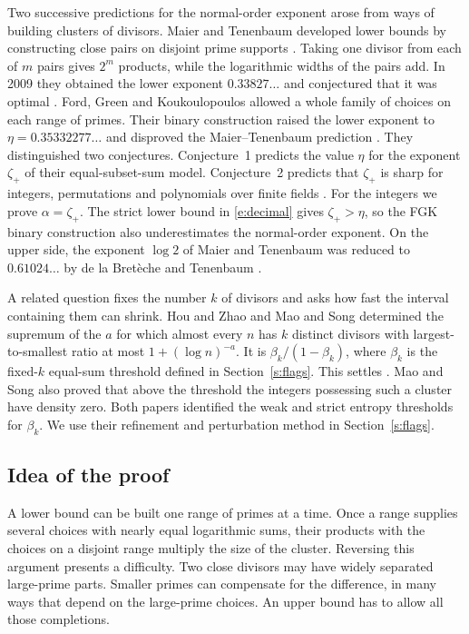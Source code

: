 \documentclass[11pt]{article}
\numberwithin{equation}{section}
\begin{document}
Two successive predictions for the normal-order exponent arose
from ways of building clusters of divisors. Maier and Tenenbaum
developed lower bounds by constructing close pairs on disjoint prime
supports \cite{mt85,mt09}. Taking one divisor from each of $m$ pairs
gives $2^m$ products, while the logarithmic widths of the pairs add.
In 2009 they obtained the lower exponent $0.33827\ldots$ and
conjectured that it was optimal \cite[Theorems~1.3--1.4 and the
conjecture following Theorem~1.4]{mt09}.
Ford, Green and Koukoulopoulos allowed a whole family of choices
on each range of primes. Their binary construction raised the lower
exponent to $\eta=0.35332277\ldots$ and disproved the Maier--Tenenbaum
prediction \cite[Corollary~1 and Theorem~3]{fgk}. They distinguished
two conjectures. Conjecture~1 predicts the value $\eta$ for the
exponent $\zeta_+$ of their equal-subset-sum model. Conjecture~2
predicts that $\zeta_+$ is sharp for integers, permutations and
polynomials over finite fields \cite{fgk}. For the integers we prove
$\alpha=\zeta_+$. The strict lower bound in \eqref{e:decimal} gives
$\zeta_+>\eta$, so the FGK binary construction also underestimates
the normal-order exponent. On the upper side, the exponent $\log2$ of Maier and
Tenenbaum \cite{mt09} was reduced to $0.61024\ldots$ by
de la Bret\`eche and Tenenbaum \cite{bt}.

A related question fixes the number $k$ of divisors and asks how
fast the interval containing them can shrink. Hou and Zhao
\cite[Theorem~2]{hz} and Mao and Song \cite[Theorem~1.2]{ms} determined
the supremum of the $a$ for which almost every $n$ has $k$ distinct
divisors with largest-to-smallest ratio at most $1+(\log n)^{-a}$.
It is $\beta_k/(1-\beta_k)$, where $\beta_k$ is the fixed-$k$
equal-sum threshold defined in Section~\ref{s:flags}. This settles
\cite[Conjecture~3]{fgk}. Mao and Song also proved that above the
threshold the integers possessing such a cluster have density zero.
Both papers identified the weak and strict entropy thresholds for
$\beta_k$. We use their refinement and perturbation method in
Section~\ref{s:flags}.

\subsection*{Idea of the proof}

A lower bound can be built one range of primes at a time. Once a
range supplies several choices with nearly equal logarithmic sums,
their products with the choices on a disjoint range multiply the
size of the cluster. Reversing this argument presents a difficulty.
Two close divisors may have widely separated large-prime parts.
Smaller primes can compensate for the difference, in many ways
that depend on the large-prime choices. An upper bound has to
allow all those completions.
\end{document}
